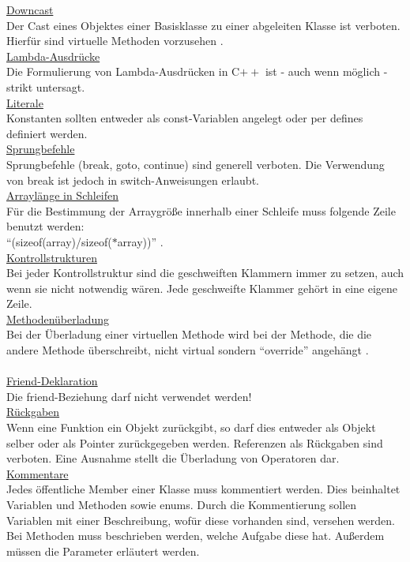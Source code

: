 \underline{Downcast}\\
Der Cast eines Objektes einer Basisklasse zu einer abgeleiten Klasse ist verboten. Hierfür sind virtuelle Methoden vorzusehen \cite[vgl.][]{HIC_3}.\bigskip \\
\underline{Lambda-Ausdrücke}\\
Die Formulierung von Lambda-Ausdrücken in C$++$ ist - auch wenn möglich - strikt untersagt.\bigskip \\
\underline{Literale}\\
Konstanten sollten entweder als const-Variablen angelegt oder per defines definiert werden.\bigskip \\
\underline{Sprungbefehle}\\
Sprungbefehle (break, goto, continue) sind generell verboten. Die Verwendung von break ist jedoch in switch-Anweisungen erlaubt.\bigskip \\
\underline{Arraylänge in Schleifen}\\
Für die Bestimmung der Arraygröße innerhalb einer Schleife muss folgende Zeile benutzt werden:\\
"`(sizeof(array)/sizeof($*$array))"' \cite[vgl.][]{HIC_4}. \bigskip \\
\underline{Kontrollstrukturen}\\
Bei jeder Kontrollstruktur sind die geschweiften Klammern immer zu setzen, auch wenn sie nicht notwendig wären. Jede geschweifte Klammer gehört in eine eigene Zeile.\bigskip \\
\underline{Methodenüberladung}\\
Bei der Überladung einer virtuellen Methode wird bei der Methode, die die andere Methode überschreibt, nicht virtual sondern "`override"' angehängt \cite[vgl.][]{HIC_5}.\\ { } \bigskip \\
\underline{Friend-Deklaration}\\
Die friend-Beziehung darf nicht verwendet werden!\bigskip \\
\underline{Rückgaben}\\
Wenn eine Funktion ein Objekt zurückgibt, so darf dies entweder als Objekt selber oder als Pointer zurückgegeben werden. Referenzen als Rückgaben sind verboten. Eine Ausnahme stellt die Überladung von Operatoren dar.\bigskip \\
\underline{Kommentare}\\
Jedes öffentliche Member einer Klasse muss kommentiert werden. Dies beinhaltet Variablen und Methoden sowie enums. Durch die Kommentierung sollen Variablen mit einer Beschreibung, wofür diese vorhanden sind, versehen werden. Bei Methoden muss beschrieben werden, welche Aufgabe diese hat. Außerdem müssen die Parameter erläutert werden.\bigskip \\
